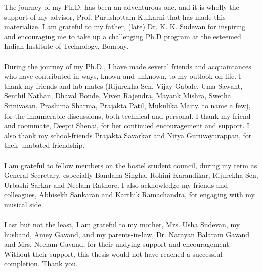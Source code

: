 The journey of my Ph.D. has been an adventurous one, and it is wholly the 
support of my advisor, Prof. Purushottam Kulkarni that has made this 
materialize. I am grateful to my father, (late) Dr. K. K. Sudevan for inspiring 
and encouraging me to take up a challenging Ph.D program at the esteemed
Indian Institute of Technology, Bombay. 
\\
\\
During the journey of my Ph.D., I have made several friends and 
acquaintances who have contributed in ways, known and unknown, 
to my outlook on life. 
I thank my friends and lab mates (Rijurekha Sen, Vijay Gabale,
Uma Sawant, Senthil Nathan, Dhaval Bonde, Viven Rajendra,
Mayank Mishra, Swetha Srinivasan, Prashima Sharma,
Prajakta Patil, Mukulika Maity, to name a few),
for the innumerable discussions, both technical and personal.
I thank my friend and roommate, Deepti Shenai, for her continued
encouragement and support. I also thank my school-friends Prajakta
Savarkar and Nitya Guruvayurappan, for their unabated friendship.
\\
\\
I am grateful to fellow members on the hostel student council,
during my term as General Secretary, especially Bandana Singha,
Rohini Karandikar, Rijurekha Sen, Urbashi Sarkar and Neelam Rathore.
I also acknowledge my friends and
colleagues, Abhisekh Sankaran and Karthik Ramachandra, for
engaging with my musical side.
\\
\\
Last but not the least, I am grateful to my mother, Mrs. Usha Sudevan, 
my husband, Amey Gavand, and my
parents-in-law, Dr. Narayan Balaram Gavand and Mrs. Neelam Gavand,
for their undying support and encouragement. Without their support,
this thesis would not have reached a successful completion. Thank you.
